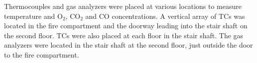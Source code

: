 Thermocouples and gas analyzers were placed at various locations to measure temperature and O$_2$, CO$_2$ and CO concentrations. A vertical array of TCs was located in the fire compartment and the doorway leading into the stair shaft on the second floor. TCs were also placed at each floor in the stair shaft. The gas analyzers were located in the stair shaft at the second floor, just outside the door to the fire compartment.



%
%
%
%
%


